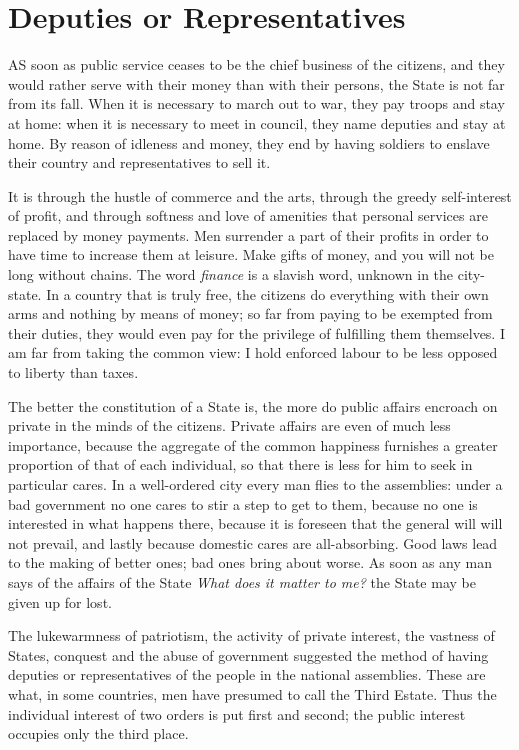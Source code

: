 \documentclass[12pt]{report}
\begin{document}
\section{Deputies or Representatives}
AS soon as public service ceases to be the chief business of the citizens, and they would rather serve with their money than with their persons, the State is not far from its fall. When it is necessary to march out to war, they pay troops and stay at home: when it is necessary to meet in council, they name deputies and stay at home. By reason of idleness and money, they end by having soldiers to enslave their country and representatives to sell it.

It is through the hustle of commerce and the arts, through the greedy self-interest of profit, and through softness and love of amenities that personal services are replaced by money payments. Men surrender a part of their profits in order to have time to increase them at leisure. Make gifts of money, and you will not be long without chains. The word \textit{finance} is a slavish word, unknown in the city-state. In a country that is truly free, the citizens do everything with their own arms and nothing by means of money; so far from paying to be exempted from their duties, they would even pay for the privilege of fulfilling them themselves. I am far from taking the common view: I hold enforced labour to be less opposed to liberty than taxes.

The better the constitution of a State is, the more do public affairs encroach on private in the minds of the citizens. Private affairs are even of much less importance, because the aggregate of the common happiness furnishes a greater proportion of that of each individual, so that there is less for him to seek in particular cares. In a well-ordered city every man flies to the assemblies: under a bad government no one cares to stir a step to get to them, because no one is interested in what happens there, because it is foreseen that the general will will not prevail, and lastly because domestic cares are all-absorbing. Good laws lead to the making of better ones; bad ones bring about worse. As soon as any man says of the affairs of the State \textit{What does it matter to me?} the State may be given up for lost.

The lukewarmness of patriotism, the activity of private interest, the vastness of States, conquest and the abuse of government suggested the method of having deputies or representatives of the people in the national assemblies. These are what, in some countries, men have presumed to call the Third Estate. Thus the individual interest of two orders is put first and second; the public interest occupies only the third place.
\end{document}
